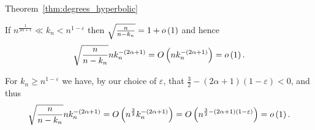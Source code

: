 \begin{proofof}{Theorem~\ref{thm:degrees_hyperbolic}}
\begin{enumerate}[\upshape (i)]
If $n^{\frac{1}{2\alpha + 1}} \ll k_n < n^{1-\varepsilon}$ then $\sqrt{\frac{n}{n-k_n}} = 1 + o\left(1\right)$ and hence
\[
	\sqrt{\frac{n}{n-k_n}} n k_n^{-(2\alpha + 1)} = O\left(n k_n^{-(2\alpha + 1)}\right) = o\left(1\right).
\]

For $k_n \ge n^{1 - \varepsilon}$ we have, by our choice of $\varepsilon$, that $\frac{3}{2} - (2\alpha + 1)(1-\varepsilon) < 0$, and thus
\[
	\sqrt{\frac{n}{n-k_n}} n k_n^{-(2\alpha + 1)} = O\left(n^{\frac{3}{2}} k_n^{-(2\alpha + 1)}\right)
	= O\left(n^{\frac{3}{2} - (2\alpha + 1)(1-\varepsilon)}\right) = o\left(1\right).
\]
\end{enumerate}
\end{proofof}

